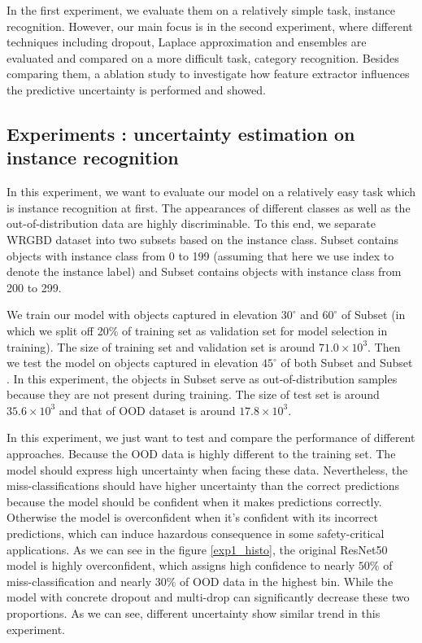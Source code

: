 In the first experiment, we evaluate them on a relatively simple task, instance recognition. However, our main focus is in the second experiment, where different techniques including dropout, Laplace approximation and ensembles are evaluated and compared on a more difficult task, category recognition. Besides comparing them, a ablation study to investigate how feature extractor influences the predictive uncertainty is performed and showed.

\subsection{Experiments : uncertainty estimation on instance recognition}
In this experiment, we want to evaluate our model on a relatively easy task which is instance recognition at first. The appearances of different classes as well as the out-of-distribution data are highly discriminable. To this end, we separate WRGBD dataset into two subsets based on the instance class. Subset  contains objects with instance class from 0 to 199 (assuming that here we use index to denote the instance label) and Subset  contains objects with instance class from 200 to 299. 

We train our model with objects captured in elevation $30^\circ$ and $60^\circ$ of Subset  (in which we split off 20\% of training set as validation set for model selection in training). The size of training set and validation set is around $71.0\times10^3$. Then we test the model on objects captured in elevation $45^\circ$ of both Subset  and Subset . In this experiment, the objects in Subset  serve as out-of-distribution samples because they are not present during training. The size of test set is around $35.6\times10^3$ and that of OOD dataset is around $17.8\times10^3$. 

In this experiment, we just want to test and compare the performance of different approaches. Because the OOD data is highly different to the training set. The model should express high uncertainty when facing these data. Nevertheless, the miss-classifications should have higher uncertainty than the correct predictions because the model should be confident when it makes predictions correctly. Otherwise the model is overconfident when it's confident with its incorrect predictions, which can induce hazardous consequence in some safety-critical applications. As we can see in the figure \ref{exp1_histo}, the original ResNet50 model is highly overconfident, which assigns high confidence to nearly $50\%$ of miss-classification and nearly $30\%$ of OOD data in the highest bin. While the model with concrete dropout and multi-drop can significantly decrease these two proportions. As we can see, different uncertainty show similar trend in this experiment.


